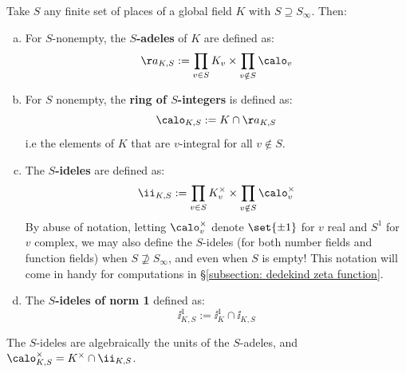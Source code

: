 \documentclass[11pt, x11names, openany]{book}
\begin{document}
\begin{defn}
    \label{def: S-versions}
    Take $S$ any finite set of places of a global field $K$ with $S \supseteq S_\infty$. Then:
\begin{enumerate}[(a)]
    \item For $S$-nonempty, the \textbf{$S$-adeles} of $K$ are defined as:
    \begin{equation*}
        \aa_{K, S} := \prod_{v \in S} K_v \times \prod_{v \notin S} \calo_v
    \end{equation*}
    \item For $S$ nonempty, the \textbf{ring of $S$-integers} is defined as:
    \begin{equation*}
        \calo_{K, S} := K \cap \aa_{K, S}
    \end{equation*}
    i.e the elements of $K$ that are $v$-integral for all $v \notin S$.
    \item The \textbf{$S$-ideles} are defined as:
    \begin{equation*}
        \ii_{K, S} := \prod_{v \in S}K_v^\times \times \prod_{v \notin S}\calo_v^\times 
    \end{equation*}
    By abuse of notation, letting $\calo_v^\times$ denote $\set{\pm 1}$ for $v$ real and $S^1$ for $v$ complex, we may also define the $S$-ideles (for both number fields and function fields) when $S \nsupseteq S_\infty$, and even when $S$ is empty! This notation will come in handy for computations in \S \ref{subsection: dedekind zeta function}.
    \item The \textbf{$S$-ideles of norm 1} defined as:
    \begin{equation*}
        \ii_{K, S}^1 := \ii_K^1 \cap \ii_{K, S}
    \end{equation*}
\end{enumerate}
\end{defn}

\begin{sanitycheck}
    The $S$-ideles are algebraically the units of the $S$-adeles, and $\calo_{K, S}^\times = K^\times \cap \ii_{K, S}$.
\end{sanitycheck}
\end{document}
